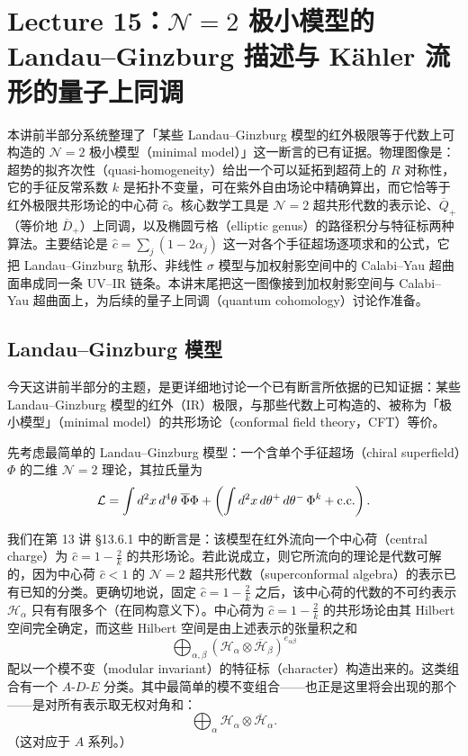 \section{Lecture 15：$\mathcal{N}=2$ 极小模型的 Landau–Ginzburg 描述与 Kähler 流形的量子上同调}

\begin{keytakeaways}
本讲前半部分系统整理了「某些 Landau--Ginzburg 模型的红外极限等于代数上可构造的 $\mathcal{N}=2$ 极小模型（minimal model）」这一断言的已有证据。物理图像是：超势的拟齐次性（quasi-homogeneity）给出一个可以延拓到超荷上的 $R$ 对称性，它的手征反常系数 $k$ 是拓扑不变量，可在紫外自由场论中精确算出，而它恰等于红外极限共形场论的中心荷 $\widehat{c}$。核心数学工具是 $\mathcal{N}=2$ 超共形代数的表示论、$\overline{Q}_+$（等价地 $\overline{D}_+$）上同调，以及椭圆亏格（elliptic genus）的路径积分与特征标两种算法。主要结论是 $\widehat{c}=\sum_j(1-2\alpha_j)$ 这一对各个手征超场逐项求和的公式，它把 Landau--Ginzburg 轨形、非线性 $\sigma$ 模型与加权射影空间中的 Calabi--Yau 超曲面串成同一条 UV--IR 链条。本讲末尾把这一图像接到加权射影空间与 Calabi--Yau 超曲面上，为后续的量子上同调（quantum cohomology）讨论作准备。
\end{keytakeaways}


\subsection{Landau--Ginzburg 模型}

今天这讲前半部分的主题，是更详细地讨论一个已有断言所依据的已知证据：某些 Landau--Ginzburg 模型的红外（IR）极限，与那些代数上可构造的、被称为「极小模型」（minimal model）的共形场论（conformal field theory，CFT）等价。

先考虑最简单的 Landau--Ginzburg 模型：一个含单个手征超场（chiral superfield）$\Phi$ 的二维 $\mathcal{N}=2$ 理论，其拉氏量为
\[
  \mathcal{L}=\int d^2x\,d^4\theta\;\overline{\Phi}\Phi
  +\left(\int d^2x\,d\theta^+\,d\theta^-\,\Phi^k+{\rm c.c.}\right).
\]

我们在第 13 讲 §13.6.1 中的断言是：该模型在红外流向一个中心荷（central charge）为 $\widehat{c}=1-\frac{2}{k}$ 的共形场论。若此说成立，则它所流向的理论是代数可解的，因为中心荷 $\widehat{c}<1$ 的 $\mathcal{N}=2$ 超共形代数（superconformal algebra）的表示已有已知的分类。更确切地说，固定 $\widehat{c}=1-\frac{2}{k}$ 之后，该中心荷的代数的不可约表示 $\mathcal{H}_\alpha$ 只有有限多个（在同构意义下）。中心荷为 $\widehat{c}=1-\frac{2}{k}$ 的共形场论由其 Hilbert 空间完全确定，而这些 Hilbert 空间是由上述表示的张量积之和
\[
  \bigoplus_{\alpha,\beta}\left(\mathcal{H}_\alpha\otimes\overline{\mathcal{H}}_\beta\right)^{e_{\alpha\beta}}
\]
配以一个模不变（modular invariant）的特征标（character）构造出来的。这类组合有一个 $A$-$D$-$E$ 分类。其中最简单的模不变组合——也正是这里将会出现的那个——是对所有表示取无权对角和：
\[
  \bigoplus_{\alpha}\mathcal{H}_\alpha\otimes\overline{\mathcal{H}}_\alpha .
\]
（这对应于 $A$ 系列。）

